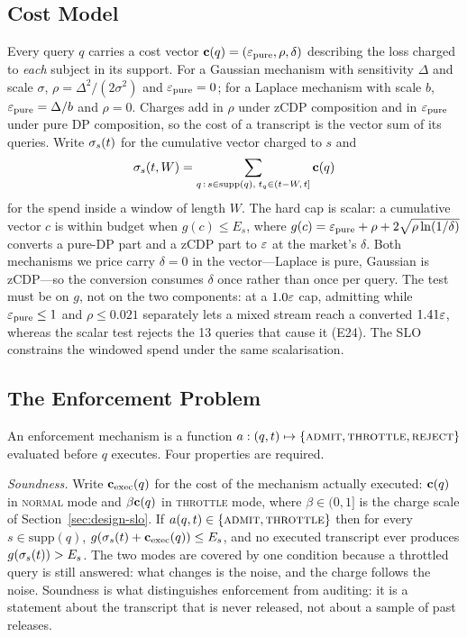 \subsection{Cost Model}

Every query $q$ carries a cost vector
$\mathbf{c}(q)=(\varepsilon_{\mathrm{pure}},\rho,\delta)$ describing the loss charged to
\emph{each} subject in its support. For a Gaussian mechanism with sensitivity
$\Delta$ and scale $\sigma$, $\rho=\Delta^{2}/(2\sigma^{2})$ and
$\varepsilon_{\mathrm{pure}}=0$; for a Laplace mechanism with scale $b$,
$\varepsilon_{\mathrm{pure}}=\Delta/b$ and $\rho=0$. Charges add in $\rho$ under zCDP
composition and in $\varepsilon_{\mathrm{pure}}$ under pure DP composition, so the cost of
a transcript is the vector sum of its queries. Write $\sigma_s(t)$ for the
cumulative vector charged to $s$ and
\begin{equation}
\sigma_s(t,W)=\sum_{q\,:\,s\in\mathrm{supp}(q),\; t_q\in(t-W,\,t]} \mathbf{c}(q)
\label{eq:window}
\end{equation}
for the spend inside a window of length $W$. The hard cap is scalar: a cumulative
vector $c$ is within budget when $g(c)\le E_s$, where
$g(c)=\varepsilon_{\mathrm{pure}}+\rho+2\sqrt{\rho\ln(1/\delta)}$ converts a pure-DP
part and a zCDP part to $\varepsilon$ at the market's $\delta$. Both mechanisms we price
carry $\delta{=}0$ in the vector---Laplace is pure, Gaussian is zCDP---so the
conversion consumes $\delta$ once rather than once per query. The test must be on
$g$, not on the two components: at a $1.0\varepsilon$ cap, admitting while
$\varepsilon_{\mathrm{pure}}\le1$ and $\rho\le0.021$ separately lets a mixed stream reach
a converted $1.41\varepsilon$, whereas the scalar test rejects the 13 queries that cause it
(E24). The SLO constrains the
windowed spend under the same scalarisation.

\subsection{The Enforcement Problem}

An enforcement mechanism is a function
$a:(q,t)\mapsto\{\textsc{admit},\textsc{throttle},\textsc{reject}\}$ evaluated
before $q$ executes. Four properties are required.

\emph{Soundness.} Write $\mathbf{c}_{\mathrm{exec}}(q)$ for the cost of the mechanism
actually executed: $\mathbf{c}(q)$ in \textsc{normal} mode and $\beta\mathbf{c}(q)$ in
\textsc{throttle} mode, where $\beta\in(0,1]$ is the charge scale of
Section~\ref{sec:design-slo}. If $a(q,t)\in\{\textsc{admit},\textsc{throttle}\}$
then for every $s\in\mathrm{supp}(q)$,
$g(\sigma_s(t)+\mathbf{c}_{\mathrm{exec}}(q))\le E_s$, and no executed transcript ever
produces $g(\sigma_s(t))>E_s$. The two modes are covered by one
condition because a throttled query is still answered: what changes is the noise,
and the charge follows the noise. Soundness is what
distinguishes enforcement from auditing: it is a statement about the transcript
that is never released, not about a sample of past releases.

